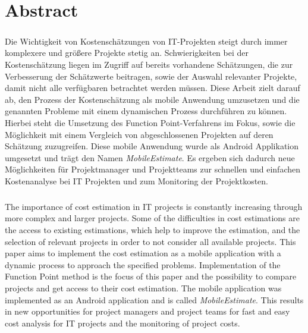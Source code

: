 

\chapter*{Abstract}

\paragraph*{}
Die Wichtigkeit von Kostenschätzungen von IT-Projekten steigt durch immer komplexere und größere Projekte stetig an. Schwierigkeiten bei der Kostenschätzung liegen im Zugriff auf bereits vorhandene Schätzungen, die zur Verbesserung der Schätzwerte beitragen, sowie der Auswahl relevanter Projekte, damit nicht alle verfügbaren betrachtet werden müssen. Diese Arbeit zielt darauf ab, den Prozess der Kostenschätzung als mobile Anwendung umzusetzen und die genannten Probleme mit einem dynamischen Prozess durchführen zu können. Hierbei steht die Umsetzung des Function Point-Verfahrens im Fokus, sowie die Möglichkeit mit einem Vergleich von abgeschlossenen Projekten auf deren Schätzung zuzugreifen. Diese mobile Anwendung wurde als Android Applikation umgesetzt und trägt den Namen \textit{MobileEstimate}. Es ergeben sich dadurch neue Möglichkeiten für Projektmanager und Projektteams zur schnellen und einfachen Kostenanalyse bei IT Projekten und zum Monitoring der Projektkosten.

\paragraph*{}
The importance of cost estimation in IT projects is constantly increasing through more complex and larger projects. Some of the difficulties in cost estimations are the access to existing estimations, which help to improve the estimation, and the selection of relevant projects in order to not consider all available projects. This paper aims to implement the cost estimation as a mobile application with a dynamic process to approach the specified problems. Implementation of the Function Point method is the focus of this paper and the possibility to compare projects and get access to their cost estimation. The mobile application was implemented as an Android application and is called \textit{MobileEstimate}. This results in new opportunities for project managers and project teams for fast and easy cost analysis for IT projects and the monitoring of project costs.

